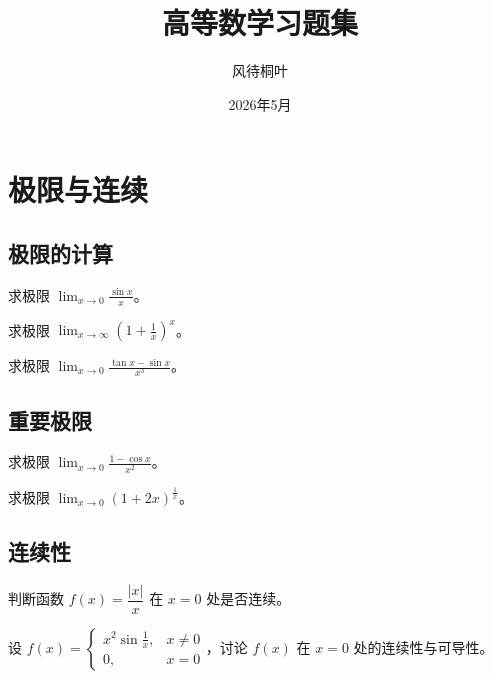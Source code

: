 \documentclass{kazetex}
\title{高等数学习题集}
\author{风待桐叶}
\date{2026年5月}
\begin{document}
\maketitle

\tableofcontents
\newpage

\section{极限与连续}

\subsection{极限的计算}

\begin{problem}
  求极限 $\displaystyle\lim_{x\to 0}\frac{\sin x}{x}$。
\end{problem}

\begin{problem}
  求极限 $\displaystyle\lim_{x\to\infty}\left(1+\frac{1}{x}\right)^x$。
\end{problem}

\begin{problem}
  求极限 $\displaystyle\lim_{x\to 0}\frac{\tan x - \sin x}{x^3}$。
\end{problem}

\subsection{重要极限}

\begin{problem}
  求极限 $\displaystyle\lim_{x\to 0}\frac{1-\cos x}{x^2}$。
\end{problem}

\begin{problem}
  求极限 $\displaystyle\lim_{x\to 0}(1+2x)^{\frac{1}{x}}$。
\end{problem}

\subsection{连续性}

\begin{problem}
  判断函数 $f(x)=\dfrac{|x|}{x}$ 在 $x=0$ 处是否连续。
\end{problem}

\begin{problem}
  设 $f(x)=\begin{cases}
    x^2\sin\frac{1}{x}, & x\neq 0\\
    0, & x=0
  \end{cases}$，讨论 $f(x)$ 在 $x=0$ 处的连续性与可导性。
\end{problem}
\end{document}

